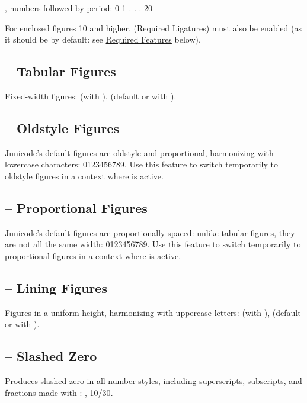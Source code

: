 , numbers followed by period: {0 1 . . . 20}

\noindent For enclosed figures 10 and higher,  (Required Ligatures) must also be enabled (as it should
be by default: see \hyperlink{req}{Required Features} below).

\subsection{ -- Tabular
Figures}
Fixed-width figures:  (with ),  (default or with
).

\subsection{ -- Oldstyle Figures}
Junicode's default figures are oldstyle and proportional, harmonizing with lowercase characters:
0123456789. Use this feature to switch temporarily to oldstyle figures in a context where
 is active.

\subsection{ -- Proportional Figures}
Junicode's default figures are proportionally spaced: unlike tabular figures, they are not
all the same width: 0123456789. Use this feature to switch temporarily to proportional figures in a context where
 is active.

\subsection{ -- Lining Figures}
Figures in a uniform height, harmonizing with uppercase letters:  (with
),  (default or with ).

\subsection{ -- Slashed Zero}
Produces slashed zero in all number styles, including superscripts, subscripts, and fractions made with
: {   ,
 10/30}.

